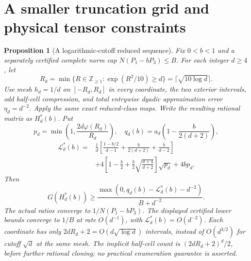 \documentclass[11pt]{article}
\newtheorem{proposition}[theorem]{Proposition}
\begin{document}
\section{A smaller truncation grid and physical tensor constraints}

\begin{proposition}[A logarithmic-cutoff reduced sequence]
\label{prop:new-log-cutoff-sequence}
Fix $0<b<1$ and a separately certified complete norm cap
$N(P_1-bP_3)\leq B$.  For each integer $d\geq4$, let
\[
 R_d=\min\{R\in\mathbb Z_{\geq1}:\exp(R^2/10)\geq d\}
           =\lceil\sqrt{10\log d}\rceil.
\]
Use mesh $h_d=1/d$ on $[-R_d,R_d]$ in every coordinate, the two
exterior intervals, odd half-cell compression, and total entrywise
dyadic approximation error $\eta_d=d^{-2}$.  Apply the same exact
reduced-class maps.  Write the resulting rational matrix as $H_d^*(b)$.
Put
\[
 p_d=\min\left(1,\frac{2d\varphi(R_d)}{R_d}\right),\quad
 q_d(b)=a_d\left(1-\frac b{2(d+2)}\right),
\]
\begin{align*}
 \mathcal L_d^*(b)={}&\frac1d
 \left[\frac{1-b/2}{d-1}+\frac b{2(d+2)}+\frac b{d-2}\right]\\
 &+4\left[1-\frac b2+\frac b2\sqrt{\frac{d+4}{d+2}}\right]
                                      \sqrt{p_d}+4bp_d.
\end{align*}
Then
\[
 G(H_d^*(b))\geq
 \frac{\max(0,q_d(b)-\mathcal L_d^*(b)-d^{-2})}{B+d^{-2}}.
\]
The actual ratios converge to $1/N(P_1-bP_3)$.
The displayed certified lower bounds converge to $1/B$ at rate
$O(d^{-1})$, with $\mathcal L_d^*(b)=O(d^{-2})$.
Each coordinate has only $2dR_d+2=O(d\sqrt{\log d})$ intervals,
instead of $O(d^{3/2})$ for cutoff $\sqrt d$ at the same mesh.
The implicit half-cell count is $(2dR_d+2)^d/2$, before further
rational cloning; no practical enumeration guarantee is asserted.
\end{proposition}
\end{document}

